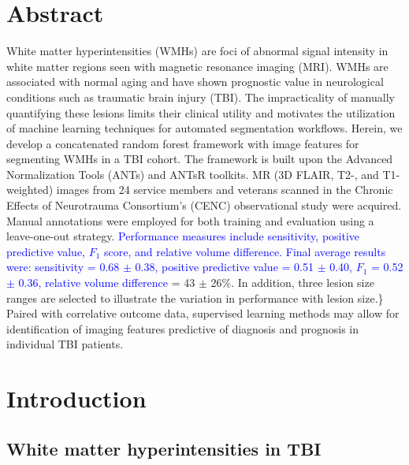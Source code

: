 \documentclass[11pt,]{article}
\title{}
\author{}
\date{}
\begin{document}
\maketitle


\section{Abstract}\label{abstract}

White matter hyperintensities (WMHs) are foci of abnormal signal
intensity in white matter regions seen with magnetic resonance imaging
(MRI). WMHs are associated with normal aging and have shown prognostic
value in neurological conditions such as traumatic brain injury (TBI).
The impracticality of manually quantifying these lesions limits their
clinical utility and motivates the utilization of machine learning
techniques for automated segmentation workflows. Herein, we develop a
concatenated random forest framework with image features for segmenting
WMHs in a TBI cohort. The framework is built upon the Advanced
Normalization Tools (ANTs) and ANTsR toolkits. MR (3D FLAIR, T2-, and
T1-weighted) images from 24 service members and veterans scanned in the
Chronic Effects of Neurotrauma Consortium's (CENC) observational study
were acquired. Manual annotations were employed for both training and
evaluation using a leave-one-out strategy.
\textcolor{blue}{Performance measures include sensitivity,
positive predictive value, $F_1$ score, and relative volume difference.
Final average results were: sensitivity = 0.68 $\pm$ 0.38, positive
predictive value = 0.51 $\pm$ 0.40, $F_1$ = 0.52 $\pm$ 0.36,
relative volume difference} = 43 \(\pm\) 26\%. In addition, three lesion
size ranges are selected to illustrate the variation in performance with
lesion size.\} Paired with correlative outcome data, supervised learning
methods may allow for identification of imaging features predictive of
diagnosis and prognosis in individual TBI patients.

\clearpage

\section{Introduction}\label{introduction}

\subsection{White matter hyperintensities in
TBI}\label{white-matter-hyperintensities-in-tbi}
\end{document}
